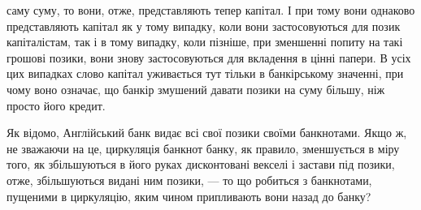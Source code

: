 \parcont{}  %
саму суму, то вони, отже, представляють тепер капітал. І при
тому вони однаково представляють капітал як у тому випадку,
коли вони застосовуються для позик капіталістам, так і в тому
випадку, коли пізніше, при зменшенні попиту на такі грошові
позики, вони знову застосовуються для вкладення в цінні папери.
В усіх цих випадках слово капітал уживається тут тільки
в банкірському значенні, при чому воно означає, що банкір змушений
давати позики на суму більшу, ніж просто його кредит.

Як відомо, Англійський банк видає всі свої позики своїми
банкнотами. Якщо ж, не зважаючи на це, циркуляція банкнот
банку, як правило, зменшується в міру того, як збільшуються
в його руках дисконтовані векселі і застави під позики, отже,
збільшуються видані ним позики, — то що робиться з банкнотами,
пущеними в циркуляцію, яким чином припливають вони
назад до банку?

